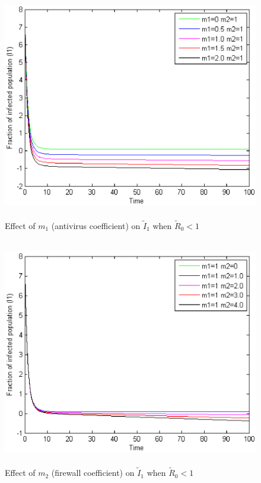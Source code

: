 \begin{figure}[h]
\centerline{\includegraphics[width=15cm,height=10cm]{13-DR13}}
\caption{Effect of $m_1$ (antivirus coefficient) on $ \tilde I_1$ when $\tilde R_0 < 1$}
\label{fig:13-DR13}
\end{figure}
\begin{figure}[h]
\centerline{\includegraphics[width=15cm,height=10cm]{13-DR11}}
\caption{Effect of $m_2$ (firewall coefficient) on $ \tilde I_1$ when $\tilde R_0 < 1$}
\label{fig:13-DR11}
\end{figure}
